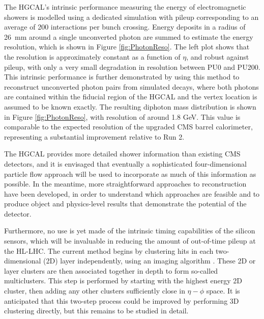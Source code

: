 The HGCAL's intrinsic performance measuring the energy of electromagnetic showers is modelled using a dedicated simulation with pileup corresponding to an average of 200 interactions per bunch crossing. 
Energy deposits in a radius of \SI{26}{mm} around a single unconverted photon are summed to estimate the energy resolution, which is shown in Figure \ref{fig:PhotonReso}.
The left plot shows that the resolution is approximately constant as a function of $\eta$, and robust against pileup, with only a very small degradation in resolution between PU0 and PU200.
This intrinsic performance is further demonstrated by using this method to reconstruct unconverted photon pairs from simulated \Hgg decays, 
where both photons are contained within the fiducial region of the HGCAL and the vertex location is assumed to be known exactly. 
The resulting diphoton mass distribution is shown in Figure \ref{fig:PhotonReso}, with resolution of around 1.8 GeV.
This value is comparable to the expected resolution of the upgraded CMS barrel calorimeter, representing a substantial improvement relative to Run 2. 

The HGCAL provides more detailed shower information than existing CMS detectors, 
and it is envisaged that eventually a sophisticated four-dimensional particle flow approach will be used to incorporate as much of this information as possible. 
In the meantime, more straightforward approaches to reconstruction have been developed, 
in order to understand which approaches are feasible and to produce object and physics-level results that demonstrate the potential of the detector. 

Furthermore, no use is yet made of the intrinsic timing capabilities of the silicon sensors, which will be invaluable in reducing the amount of out-of-time pileup at the HL-LHC. 
The current method begins by clustering hits in each two-dimensional (2D) layer independently, using an imaging algorithm \cite{ClusteringAlgo}.
These 2D or layer clusters are then associated together in depth to form so-called multiclusters. 
This step is performed by starting with the highest energy 2D cluster, then adding any other clusters sufficiently close in $\eta-\phi$ space. 
It is anticipated that this two-step process could be improved by performing 3D clustering directly, but this remains to be studied in detail. 

